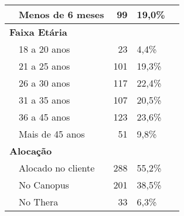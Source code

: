 \documentclass[]{article}
\begin{document}
\begin{table}[t]
\begin{tabular}{l|l|r|l|>{}p{8cm}}
\hline
\hspace{1em} & Menos de 6 meses & 99 & 19,0\%\\
\hline
\multicolumn{4}{l}{\textbf{Faixa Etária}}\\
\hline
\hspace{1em} & 18 a 20 anos & 23 & 4,4\%\\
\hline
\hspace{1em} & 21 a 25 anos & 101 & 19,3\%\\
\hline
\hspace{1em} & 26 a 30 anos & 117 & 22,4\%\\
\hline
\hspace{1em} & 31 a 35 anos & 107 & 20,5\%\\
\hline
\hspace{1em} & 36 a 45 anos & 123 & 23,6\%\\
\hline
\hspace{1em} & Mais de 45 anos & 51 & 9,8\%\\
\hline
\multicolumn{4}{l}{\textbf{Alocação}}\\
\hline
\hspace{1em} & Alocado no cliente & 288 & 55,2\%\\
\hline
\hspace{1em} & No Canopus & 201 & 38,5\%\\
\hline
\hspace{1em} & No Thera & 33 & 6,3\%\\
\hline
\end{tabular}
\end{table}
\end{document}
